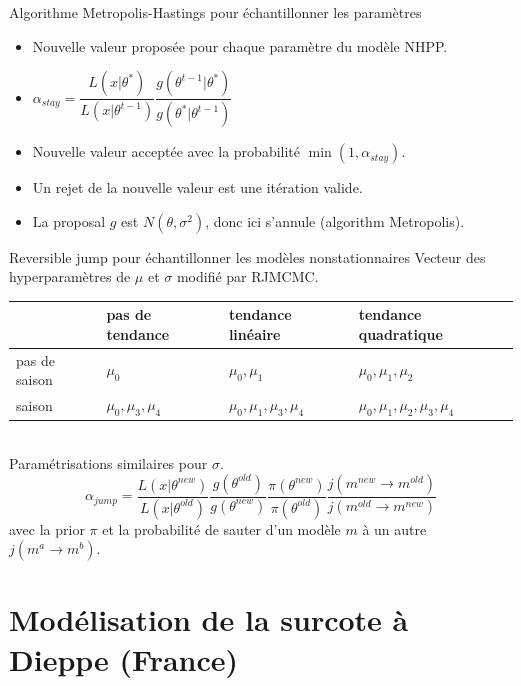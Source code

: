 \documentclass[aspectratio=169]{beamer}
\begin{document}
\begin{frame}{Algorithme Metropolis-Hastings pour échantillonner les paramètres}
	\begin{itemize}
	\setlength{\itemsep}{17pt}
	\item Nouvelle valeur proposée pour chaque paramètre du modèle NHPP.
	\item $\alpha_{stay} = \dfrac{L(x|\theta^*)}{L(x|\theta^{t-1})} \dfrac{g(\theta^{t-1}|\theta^*)}{g(\theta^*|\theta^{t-1})}$
	\item Nouvelle valeur acceptée avec la probabilité $\min(1, \alpha_{stay})$.
	\item Un rejet de la nouvelle valeur est une itération valide.
	\item La proposal $g$ est $N(\theta, \sigma^2)$, donc ici s'annule (algorithm Metropolis).
	\end{itemize}
\end{frame}


\begin{frame}{Reversible jump pour échantillonner les modèles nonstationnaires}
Vecteur des hyperparamètres de $\mu$ et $\sigma$ modifié par RJMCMC.
\vspace{0.5cm} \\
\begin{centering}
\begin{tabular}{ l|lll }
  & pas de tendance & tendance linéaire & tendance quadratique \\
 \hline
 pas de saison & $\mu_0$ & $\mu_0, \mu_1$ & $\mu_0, \mu_1, \mu_2$ \\ 
 saison & $\mu_0, \mu_3, \mu_4$ & $\mu_0, \mu_1, \mu_3, \mu_4$ & $\mu_0, \mu_1, \mu_2, \mu_3, \mu_4$ \\
 \hline
\end{tabular}
\end{centering}
\vspace{0.2cm} \\
Paramétrisations similaires pour $\sigma$.
\begin{equation*}
\alpha_{jump} =
\dfrac{L(x|\theta^{new})}{L(x|\theta^{old})}
\dfrac{g(\theta^{old})}{g(\theta^{new})}
\dfrac{\pi(\theta^{new})}{\pi(\theta^{old})}
\dfrac{j(m^{new} \rightarrow m^{old})}{j(m^{old} \rightarrow m^{new})}
\end{equation*}
avec la prior $\pi$ et la probabilité de sauter d'un modèle $m$ à un autre $j(m^a \rightarrow m^b)$.
\end{frame}



\section{Modélisation de la surcote à Dieppe (France)}
\end{document}

